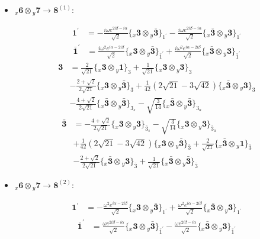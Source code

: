 \documentclass[english]{article}
\newcommand{\rep}[1]{\mathbf{#1}}
\newcommand{\repx}[2]{{}_{#2}\mathbf{#1}}
\newcommand{\tsprodx}[2]{\repx{#1}{x}\otimes\repx{#2}{y}}
\newcommand{\subcgt}[3]{\big\{ \tsprodx{#1}{#2}\big\}^{}_{#3}}
\begin{document}
\begin{itemize}
\begin{fleqn}
\end{fleqn}
\item $\tsprodx{6}{7}\to\rep{8}^{(1)}$:
\begin{fleqn}
\begin{align*}
\rep{1^{\prime}} & = -\frac{i \omega  e^{2 i \beta -i \alpha }}{\sqrt{2}}\subcgt{3}{\bar{3}}{1^{\prime}}-\frac{i \omega  e^{2 i \beta -i \alpha }}{\sqrt{2}}\subcgt{\bar{3}}{3}{1^{\prime}}
\end{align*}
\begin{align*}
\rep{\bar{1}^{\prime}} & = \frac{i \omega ^2 e^{i \alpha -2 i \beta }}{\sqrt{2}}\subcgt{3}{\bar{3}}{\bar{1}^{\prime}}+\frac{i \omega ^2 e^{i \alpha -2 i \beta }}{\sqrt{2}}\subcgt{\bar{3}}{3}{\bar{1}^{\prime}}
\end{align*}
\begin{align*}
\rep{3} & = \frac{2}{\sqrt{21}}\subcgt{3}{1}{3}+\frac{1}{\sqrt{21}}\subcgt{3}{3}{3} \\ 
 & -\frac{2+\sqrt{2}}{2 \sqrt{21}}\subcgt{3}{\bar{3}}{3}+\frac{1}{42} \left(2 \sqrt{21}-3 \sqrt{42}\right)\subcgt{\bar{3}}{3}{3} \\ 
 & -\frac{4+\sqrt{2}}{2 \sqrt{21}}\subcgt{\bar{3}}{\bar{3}}{3_{s}}-\sqrt{\frac{3}{14}}\subcgt{\bar{3}}{\bar{3}}{3_{a}}
\end{align*}
\begin{align*}
\rep{\bar{3}} & = -\frac{4+\sqrt{2}}{2 \sqrt{21}}\subcgt{3}{3}{\bar{3}_{s}}-\sqrt{\frac{3}{14}}\subcgt{3}{3}{\bar{3}_{a}} \\ 
 & +\frac{1}{42} \left(2 \sqrt{21}-3 \sqrt{42}\right)\subcgt{3}{\bar{3}}{\bar{3}}+\frac{2}{\sqrt{21}}\subcgt{\bar{3}}{1}{\bar{3}} \\ 
 & -\frac{2+\sqrt{2}}{2 \sqrt{21}}\subcgt{\bar{3}}{3}{\bar{3}}+\frac{1}{\sqrt{21}}\subcgt{\bar{3}}{\bar{3}}{\bar{3}}
\end{align*}
\end{fleqn}
\item $\tsprodx{6}{7}\to\rep{8}^{(2)}$:
\begin{fleqn}
\begin{align*}
\rep{1^{\prime}} & = -\frac{\omega ^2 e^{i \alpha -2 i \beta }}{\sqrt{2}}\subcgt{3}{\bar{3}}{1^{\prime}}+\frac{\omega ^2 e^{i \alpha -2 i \beta }}{\sqrt{2}}\subcgt{\bar{3}}{3}{1^{\prime}}
\end{align*}
\begin{align*}
\rep{\bar{1}^{\prime}} & = \frac{\omega  e^{2 i \beta -i \alpha }}{\sqrt{2}}\subcgt{3}{\bar{3}}{\bar{1}^{\prime}}-\frac{\omega  e^{2 i \beta -i \alpha }}{\sqrt{2}}\subcgt{\bar{3}}{3}{\bar{1}^{\prime}}

\end{align*}
\end{fleqn}
\end{itemize}
\end{document}
